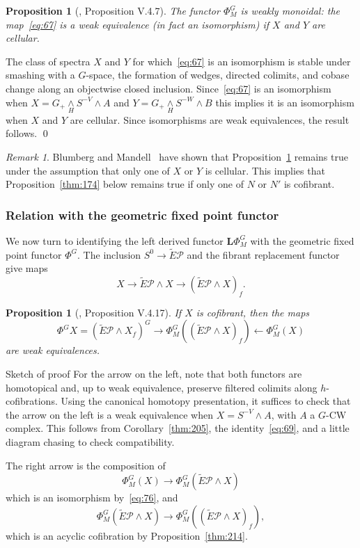\documentclass{amsart}
\newtheorem{prop}[equation]{Proposition}
\newtheorem{rem}[equation]{Remark}
\theoremstyle{definition}
\theoremstyle{remark}
\newtheorem{rem}[equation]{Remark}
\newenvironment{pf}{\bigskip{\em Proof:\/}}{\qed\medskip}
\newenvironment{pf*}[1]{\bigskip{\em #1:\/}}{\qed\medskip}
\newcommand{\smashove}[1]{\underset{#1}{\wedge}}
\newcommand{\gfp}[1]{\Phi^{#1}}
\newcommand{\gfpm}[1]{\Phi_{M}^{#1}}
\newcommand{\phig}{\gfp{G}}
\newcommand{\phigm}{\gfpm{G}}
\newcommand{\pfamily}{\mathcal P}
\newcommand{\lder}{\mathbf{L}}
\begin{document}
\begin{prop}[\cite{MR1922205}, Proposition V.4.7]
\label{thm:55} The functor $\phigm$ is weakly monoidal: the
map~\eqref{eq:67} is a weak equivalence (in fact an isomorphism) if
$X$ and $Y$ are cellular.
\end{prop}

\begin{pf}
The class of spectra $X$ and $Y$ for which~\eqref{eq:67} is an
isomorphism is stable under smashing with a $G$-space, the formation
of wedges, directed colimits, and cobase change along an objectwise
closed inclusion.  Since~\eqref{eq:67} is an isomorphism when
$X=G_{+}\smashove{H} S^{-V}\wedge A$ and $Y=G_{+}\smashove{H}
S^{-W}\wedge B$ this implies it is an isomorphism when $X$ and $Y$ are
cellular.  Since isomorphisms are weak equivalences, the result
follows.
\end{pf}

\begin{rem}
\label{rem:18} 
Blumberg and
Mandell~\cite[Appendix~A]{blumberg_cylcotomic} have shown that
Proposition~\ref{thm:55} remains true under the assumption that only
one of $X$ or $Y$ is cellular.  This implies that
Proposition~\ref{thm:174} below remains true if only one of $N$ or
$N'$ is cofibrant.
\end{rem}

\subsubsection{Relation with the geometric fixed point functor}
\label{sec:relat-with-isotr}

We now turn to identifying the left derived functor $\lder\phigm$ with
the geometric fixed point functor $\phig$.  The inclusion $S^{0}\to
\tilde E\pfamily$ and the fibrant replacement functor give maps
\[
X \to \tilde E\pfamily\wedge X \to (\tilde E\pfamily\wedge X)_{f}.
\]

\begin{prop}[\cite{MR1922205}, Proposition V.4.17]
\label{thm:14}
If $X$ is cofibrant, then the maps 
\[
\phig X = (\tilde E\pfamily\wedge X_{f})^{G} \to \phigm((\tilde
E\pfamily\wedge X)_{f}) \leftarrow \phigm(X)
\]
are weak equivalences.
\end{prop}

\begin{pf*}{Sketch of proof}
For the arrow on the left, note that both functors
are homotopical and, up to weak equivalence, preserve filtered
colimits along $h$-cofibrations.  Using the canonical homotopy
presentation, it suffices to check that the arrow on the left is a
weak equivalence when $X=S^{-V}\wedge A$, with $A$ a $G$-CW complex.
This follows from Corollary~\ref{thm:205}, the identity~\eqref{eq:69},
and a little diagram chasing to check compatibility.

The right arrow is the composition of
\[
\phigm(X)\to \phigm(\tilde E\pfamily\wedge X)
\]
which is an isomorphism by~\eqref{eq:76}, and 
\[
\phigm(\tilde E\pfamily\wedge X)\to \phigm((\tilde E\pfamily\wedge X)_{f}),
\]
which is an acyclic cofibration by Proposition~\ref{thm:214}.
\end{pf*}
\end{document}
